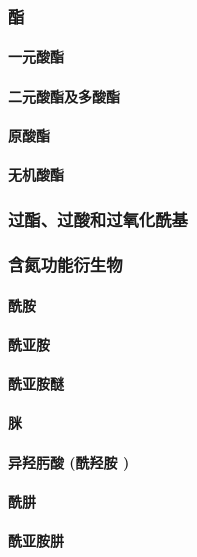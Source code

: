 \documentclass[UTF8]{../03-Chemistry}
\begin{document}
        \subsubsection{酯}
            \paragraph{一元酸酯}
            \paragraph{二元酸酯及多酸酯}
            \paragraph{原酸酯}
            \paragraph{无机酸酯}
        \subsubsection{过酯、过酸和过氧化酰基}
        \subsubsection{含氮功能衍生物}
            \paragraph{酰胺}
            \paragraph{酰亚胺}
            \paragraph{酰亚胺醚}
            \paragraph{脒}
            \paragraph{异羟肟酸 (酰羟胺 )}
            \paragraph{酰肼}
            \paragraph{酰亚胺肼}
\end{document}
